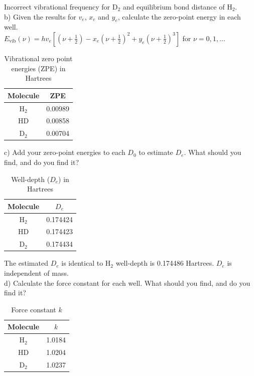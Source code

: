 \documentclass{article}
\begin{document}
{\color{blue} Incorrect vibrational frequency for D$_2$ and equilibrium
  bond distance of H$_2$.
}
\\

\noindent b) Given the results for $v_e$, $x_e$ and $y_e$, calculate the zero-point
energy in each well.
\\
{\color{blue} $E_{\text{vib}}(\nu)=hv_e[(\nu+\frac{1}{2})-x_e(\nu+\frac{1}{2})^2+y_e(\nu+\frac{1}{2})^3]$
  for $\nu={0,1,...}$}
\begin{table}[H]
  \caption{Vibrational zero point energies (ZPE) in Hartrees}
  \centering
  \begin{tabular}{c|c}
    Molecule & ZPE \\
    \hline
    H$_2$ & 0.00989 \\
    HD    & 0.00858 \\
    D$_2$ & 0.00704
  \end{tabular}
\end{table}

\noindent c) Add your zero-point energies to each $D_0$ to estimate $D_e$. What should
you find, and do you find it?
\\
\begin{table}[H]
  \caption{Well-depth ($D_e$) in Hartrees}
  \centering
  \begin{tabular}{c|c}
    Molecule & $D_e$ \\
    \hline
    H$_2$ & 0.174424 \\
    HD    & 0.174423 \\
    D$_2$ & 0.174434
  \end{tabular}
\end{table}

{\color{blue} The estimated $D_e$ is identical to H$_2$ well-depth is 0.174486 Hartrees.
  $D_e$ is independent of mass.
}
\\

\noindent d) Calculate the force constant for each well. What should you find,
and do you find it?

\begin{table}[H]
  \caption{Force constant $k$}
  \centering
  \begin{tabular}{c|c}
    Molecule & $k$ \\
    \hline
    H$_2$ & 1.0184 \\
    HD    & 1.0204 \\
    D$_2$ & 1.0237
  \end{tabular}
\end{table}
\end{document}
